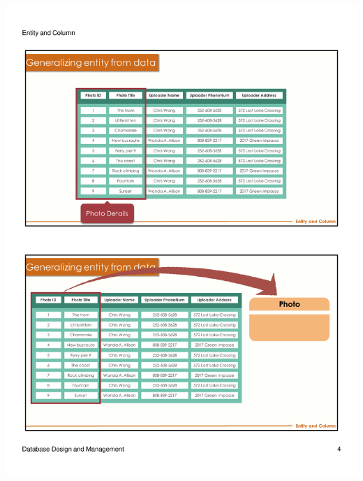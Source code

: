 \begin{frame}{ }
    \centering
    \includegraphics[width=\textwidth, trim={10mm 24mm 10mm 134mm}, clip]{resources/02/02_4}
\end{frame}
